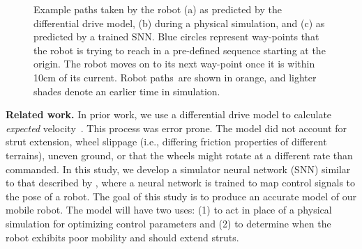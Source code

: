 \begin{figure}[ht]
    \centering
    \hfil
    \hfil
    \vspace{-0.05in}
    \caption{Example paths taken by the robot (a) as predicted by the differential drive model, (b) during a physical simulation, and (c) as predicted by a trained SNN. Blue circles represent way-points that the robot is trying to reach in a pre-defined sequence starting at the origin. The robot moves on to its next way-point once it is within 10\si{cm} of its current. Robot paths are shown in orange, and lighter shades denote an earlier time in simulation.}
    \label{fig:paths}
    \vspace{-0.2in}
\end{figure}

\noindent
\textbf{Related work.}
%
In prior work, we use a differential drive model to calculate \emph{expected} velocity~\citep{Clark.2018.C.EvolvingControllersTransformable}. This process was error prone.
%
The model did not account for strut extension, wheel slippage (i.e., differing friction properties of different terrains), uneven ground, or that the wheels might rotate at a different rate than commanded.
%
In this study, we develop a simulator neural network (SNN) similar to that described by \citet{Pretorius.2014.2ICECC.ComparisonNeuralNetworks}, where a neural network is trained to map control signals to the pose of a robot.
%
The goal of this study is to produce an accurate model of our mobile robot. The model will have two uses: (1) to act in place of a physical simulation for optimizing control parameters and (2) to determine when the robot exhibits poor mobility and should extend struts.

\vspace{-0.1in}
